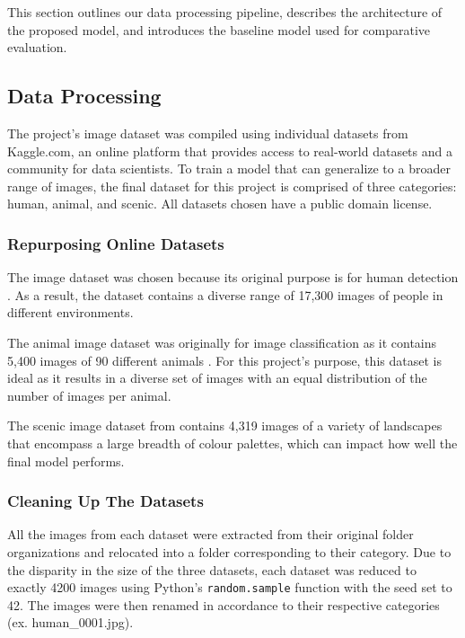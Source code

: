 \documentclass{article} %
\begin{document}
This section outlines our data processing pipeline, describes the architecture of the proposed model, and introduces the baseline model used for comparative evaluation.

\subsection{Data Processing}

 The project's image dataset was compiled using individual datasets from Kaggle.com, an online platform that provides access to real-world datasets and a community for data scientists. To train a model that can generalize to a broader range of images, the final dataset for this project is comprised of three categories: human, animal, and scenic. All datasets chosen have a public domain license. 

 \subsubsection{Repurposing Online Datasets}

The  image dataset was chosen because its original purpose is for human detection \cite[]{kaggle_human}. As a result, the dataset contains a diverse range of 17,300 images of people in different environments. 

The animal image dataset was originally for image classification as it contains 5,400 images of 90 different animals \cite[]{kaggle_animal}. For this project’s purpose, this dataset is ideal as it results in a diverse set of images with an equal distribution of the number of images per animal. 

The scenic image dataset from \cite{kaggle_scene} contains 4,319 images of a variety of landscapes that encompass a large breadth of colour palettes, which can impact how well the final model performs.

\subsubsection{Cleaning Up The Datasets}
All the images from each dataset were extracted from their original folder organizations and relocated into a folder corresponding to their category. Due to the disparity in the size of the three datasets, each dataset was reduced to exactly 4200 images using Python’s \verb|random.sample| function with the seed set to 42. The images were then renamed in accordance to their respective categories (ex. human\_0001.jpg). 
\end{document}

